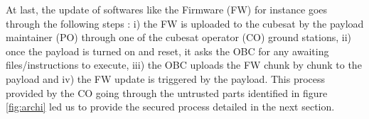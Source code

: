At last, the update of softwares like the Firmware (FW) for instance goes
through the following steps : i) the FW is uploaded to the cubesat by the
payload maintainer (PO) through one of the cubesat operator (CO) ground
stations, ii) once the payload is turned on and reset, it asks the OBC for any
awaiting files/instructions to execute, iii) the OBC uploads the FW chunk by
chunk to the payload and iv) the FW update is triggered by the payload. This
process provided by the CO going through the untrusted parts identified in
figure \ref{fig:archi} led us to provide the secured process detailed in the
next section.
